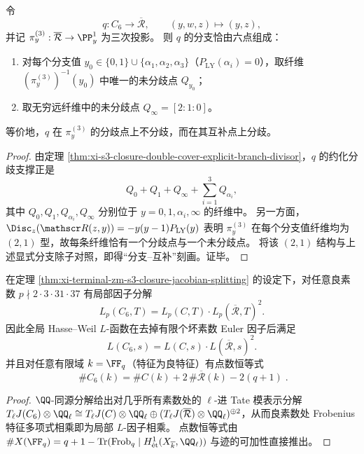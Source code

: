 \begin{proposition}[二次商映射的分支互补性与六点分支除子]\label{prop:xi-terminal-zm-s3-double-cover-branch-complementarity}
令
\[
q:C_6\to \overline{\mathcal R},\qquad (y,w,z)\mapsto (y,z),
\]
并记 \(\pi_y^{(3)}:\overline{\mathcal R}\to\PP^1_y\) 为三次投影。
则 \(q\) 的分支恰由六点组成：
\begin{enumerate}
  \item 对每个分支值 \(y_0\in\{0,1\}\cup\{\alpha_1,\alpha_2,\alpha_3\}\)（\(P_{\mathrm{LY}}(\alpha_i)=0\)），取纤维 \((\pi_y^{(3)})^{-1}(y_0)\) 中唯一的未分歧点 \(Q_{y_0}\)；
  \item 取无穷远纤维中的未分歧点 \(Q_\infty=[2:1:0]\)。
\end{enumerate}
等价地，\(q\) 在 \(\pi_y^{(3)}\) 的分歧点上不分歧，而在其互补点上分歧。
\end{proposition}
\begin{proof}
由定理 \ref{thm:xi-s3-closure-double-cover-explicit-branch-divisor}，\(q\) 的约化分歧支撑正是
\[
Q_0+Q_1+Q_\infty+\sum_{i=1}^3Q_{\alpha_i},
\]
其中 \(Q_0,Q_1,Q_{\alpha_i},Q_\infty\) 分别位于 \(y=0,1,\alpha_i,\infty\) 的纤维中。
另一方面，\(\Disc_z(\mathscr R(z,y))=-y(y-1)P_{\mathrm{LY}}(y)\) 表明
\(\pi_y^{(3)}\) 在每个分支值纤维均为 \((2,1)\) 型，故每条纤维恰有一个分歧点与一个未分歧点。
将该 \((2,1)\) 结构与上述显式分支除子对照，即得“分支--互补”刻画。证毕。
\end{proof}

\begin{corollary}\label{cor:xi-terminal-zm-s3-closure-hasse-weil-factorization}
在定理 \ref{thm:xi-terminal-zm-s3-closure-jacobian-splitting} 的设定下，对任意良素数 \(p\nmid 2\cdot 3\cdot 31\cdot 37\) 有局部因子分解
\[
L_p(C_6,T)=L_p(C,T)\cdot L_p(\overline{\mathcal R},T)^2.
\]
因此全局 Hasse--Weil \(L\)-函数在去掉有限个坏素数 Euler 因子后满足
\[
L(C_6,s)=L(C,s)\cdot L(\overline{\mathcal R},s)^2.
\]
并且对任意有限域 \(k=\FF_q\)（特征为良特征）有点数恒等式
\[
\boxed{\;
\#C_6(k)=\#C(k)+2\,\#\overline{\mathcal R}(k)-2(q+1)\; }.
\]
\end{corollary}
\begin{proof}
\(\QQ\)-同源分解给出对几乎所有素数处的 \(\ell\)-进 Tate 模表示分解
\(
T_\ell J(C_6)\otimes\QQ_\ell\cong T_\ell J(C)\otimes\QQ_\ell\oplus (T_\ell J(\overline{\mathcal R})\otimes\QQ_\ell)^{\oplus 2}
\)，从而良素数处 Frobenius 特征多项式相乘即为局部 \(L\)-因子相乘。
点数恒等式由
\(
\#X(\FF_q)=q+1-\mathrm{Tr}(\mathrm{Frob}_q\mid H^1_{\text{ét}}(X_{\overline{k}},\QQ_\ell))
\)
与迹的可加性直接推出。
\end{proof}

